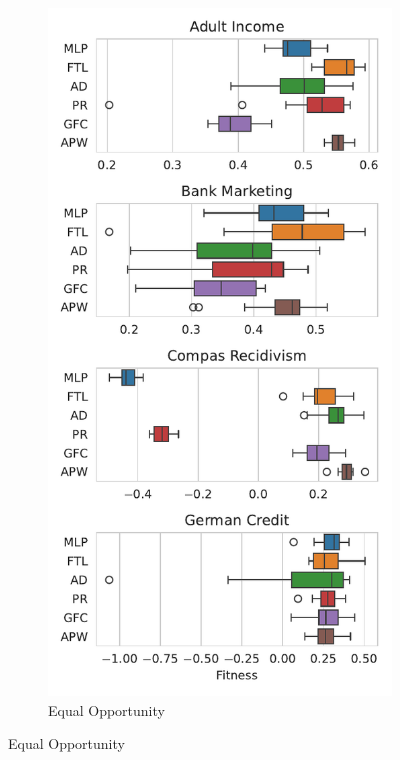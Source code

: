\begin{figure}[!ht]
\begin{subfigure}{.32\linewidth}
\end{subfigure}
\begin{subfigure}{.32\linewidth}
    \caption{Equal Opportunity}
    \label{fig:boxplot_mcc_opp}
    \includegraphics[width=1\linewidth]{images/boxplot_mcc_opportunity.pdf}

\end{subfigure}
\end{figure}
